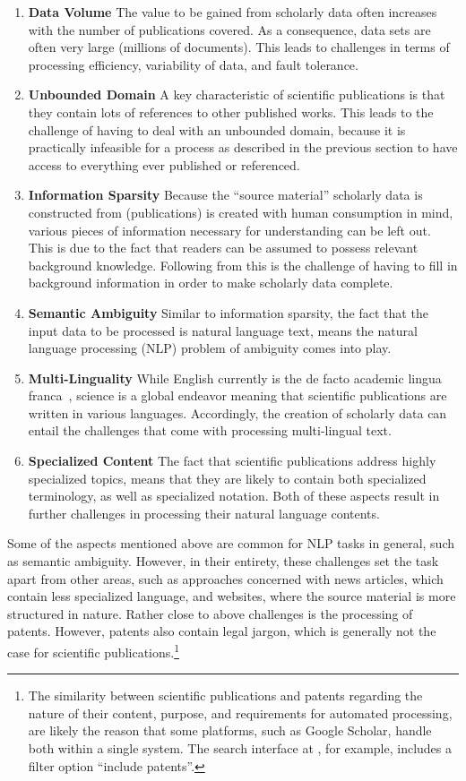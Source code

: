 \begin{enumerate}
    \item \textbf{Data Volume} The value to be gained from scholarly data often increases with the number of publications covered. As a consequence, data sets are often very large (millions of documents). This leads to challenges in terms of processing efficiency, variability of data, and fault tolerance.
    \item \textbf{Unbounded Domain} A key characteristic of scientific publications is that they contain lots of references to other published works. This leads to the challenge of having to deal with an unbounded domain, because it is practically infeasible for a process as described in the previous section to have access to everything ever published or referenced.
    \item \textbf{Information Sparsity} Because the ``source material'' scholarly data is constructed from (publications) is created with human consumption in mind, various pieces of information necessary for understanding can be left out. This is due to the fact that readers can be assumed to possess relevant background knowledge. Following from this is the challenge of having to fill in background information in order to make scholarly data complete.
    \item \textbf{Semantic Ambiguity} Similar to information sparsity, the fact that the input data to be processed is natural language text, means the natural language processing (NLP) problem of ambiguity comes into play.
    \item \textbf{Multi-Linguality} While English currently is the de facto academic lingua franca~\cite{Montgomery2013}, science is a global endeavor meaning that scientific publications are written in various languages. Accordingly, the creation of scholarly data can entail the challenges that come with processing multi-lingual text.
    \item \textbf{Specialized Content} The fact that scientific publications address highly specialized topics, means that they are likely to contain both specialized terminology, as well as specialized notation. Both of these aspects result in further challenges in processing their natural language contents.
\end{enumerate}

Some of the aspects mentioned above are common for NLP tasks in general, such as semantic ambiguity. However, in their entirety, these challenges set the task apart from other areas, such as approaches concerned with news articles, which contain less specialized language, and websites, where the source material is more structured in nature. Rather close to above challenges is the processing of patents. However, patents also contain legal jargon, which is generally not the case for scientific publications.\footnote{The similarity between scientific publications and patents regarding the nature of their content, purpose, and requirements for automated processing, are likely the reason that some platforms, such as Google Scholar, handle both within a single system. The search interface at , for example, includes a filter option ``include patents''.}

